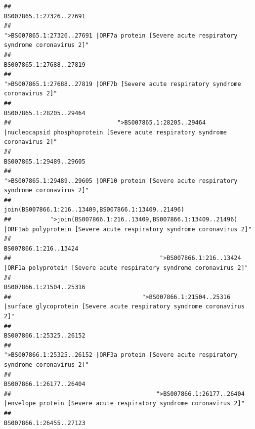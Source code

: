 \documentclass[
]{article}
\begin{document}
\begin{verbatim}
##                                                                                                                BS007865.1:27326..27691 
##                                            ">BS007865.1:27326..27691 |ORF7a protein [Severe acute respiratory syndrome coronavirus 2]" 
##                                                                                                                BS007865.1:27688..27819 
##                                                    ">BS007865.1:27688..27819 |ORF7b [Severe acute respiratory syndrome coronavirus 2]" 
##                                                                                                                BS007865.1:28205..29464 
##                              ">BS007865.1:28205..29464 |nucleocapsid phosphoprotein [Severe acute respiratory syndrome coronavirus 2]" 
##                                                                                                                BS007865.1:29489..29605 
##                                            ">BS007865.1:29489..29605 |ORF10 protein [Severe acute respiratory syndrome coronavirus 2]" 
##                                                                                    join(BS007866.1:216..13409,BS007866.1:13409..21496) 
##           ">join(BS007866.1:216..13409,BS007866.1:13409..21496) |ORF1ab polyprotein [Severe acute respiratory syndrome coronavirus 2]" 
##                                                                                                                  BS007866.1:216..13424 
##                                          ">BS007866.1:216..13424 |ORF1a polyprotein [Severe acute respiratory syndrome coronavirus 2]" 
##                                                                                                                BS007866.1:21504..25316 
##                                     ">BS007866.1:21504..25316 |surface glycoprotein [Severe acute respiratory syndrome coronavirus 2]" 
##                                                                                                                BS007866.1:25325..26152 
##                                            ">BS007866.1:25325..26152 |ORF3a protein [Severe acute respiratory syndrome coronavirus 2]" 
##                                                                                                                BS007866.1:26177..26404 
##                                         ">BS007866.1:26177..26404 |envelope protein [Severe acute respiratory syndrome coronavirus 2]" 
##                                                                                                                BS007866.1:26455..27123 

\end{verbatim}
\end{document}

